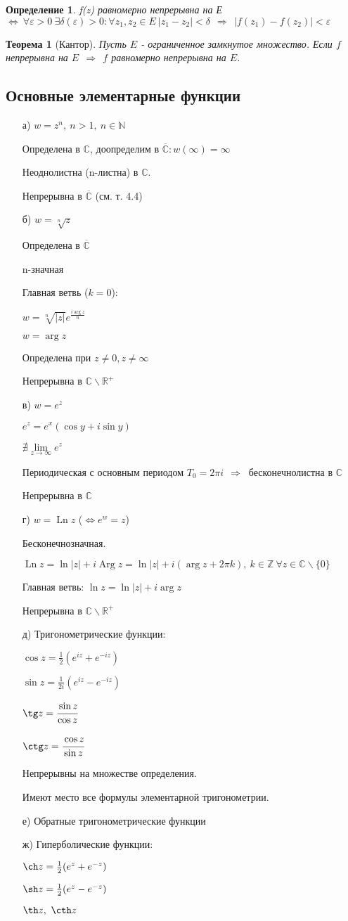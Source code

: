 \documentclass[draft]{report}
\newcommand{\then}{\ \Rightarrow\ }
\newcommand{\R}{\mathbb{R}}
\newcommand{\Z}{\mathbb{Z}}
\renewcommand{\C}{\mathbb{C}}
\newcommand{\N}{\mathbb{N}}
\newcommand{\mlim}[1]{\underset{#1}{\lim}}
\newcommand{\LRA}{\Leftrightarrow}
\newcommand{\epsdelta}{\forall \e>0\ \exists \delta(\e)>0\colon}
\renewcommand{\bar}{\overline}
\newcommand{\Ln}{\mathop{\mathrm{Ln}}\nolimits}
\newcommand{\Arg}{\mathop{\mathrm{Arg}}\nolimits}
\newcommand{\e}{\varepsilon}
\newcommand{\CC}{\bar{\C}}
\newcommand{\opr}[1]{\begin{opred}#1\end{opred}}
\newtheorem*{theor}{Теорема}
\newtheorem*{opred}{Определение}
\theoremstyle{remark}
\begin{document}
\opr{f(z) равномерно непрерывна на Е $\LRA\ \epsdelta \forall z_1,z_2\in E\ |z_1-z_2|<\delta\ \then\ |f(z_1)-f(z_2)|<\e$}

\begin{theor}[Кантор]
Пусть $E$ - ограниченное замкнутое множество. Если $f$ непрерывна на $E\ \then\ f$ равномерно непрерывна на $E$.
\end{theor}

\subsection{Основные элементарные функции}

\begin{itemize}
\item[а)] $w=z^n,\ n>1,\ n\in\N$

Определена в $\C$, доопределим в $\CC\colon w(\infty)=\infty$

Неоднолистна (n-листна) в $\C$.

Непрерывна в $\CC$ (см. т. 4.4)
\item[б)] $w=\sqrt[n]{z}$

Определена в $\CC$

n-значная

Главная ветвь ($k=0$):

$w=\sqrt[n]{|z|}e^{\frac{i\arg z}{n}}$

$w=\arg z$

Определена при $z\neq0,z\neq\infty$

Непрерывна в $\C\smallsetminus\R^+$
\item[в)] $w=e^z$

$e^z=e^x(\cos y+i\sin y)$

$\nexists\mlim{z\to\infty}e^z$

Периодическая с основным периодом $T_0=2\pi i\ \then$ бесконечнолистна в $\C$

Непрерывна в $\C$
\item[г)] $w=\Ln z$ ($\LRA e^w=z$)

Бесконечнозначная.

$\Ln z=\ln|z|+i\Arg z=\ln|z|+i(\arg z+2\pi k),\ k\in\Z\ \forall z\in\C\smallsetminus\{0\}$

Главная ветвь: $\ln z=\ln|z|+i\arg z$

Непрерывна в $\C\smallsetminus\R^+$
\item[д)] Тригонометрические функции:

$\cos z=\frac12(e^{iz}+e^{-iz})$

$\sin z=\frac1{2i}(e^{iz}-e^{-iz})$

$\tg z=\cfrac{\sin z}{\cos z}$

$\ctg z=\cfrac{\cos z}{\sin z}$

Непрерывны на множестве определения.

Имеют место все формулы элементарной тригонометрии.
\item[е)] Обратные тригонометрические функции
\item[ж)] Гиперболические функции:

$\ch z=\frac12(e^z+e^{-z})$

$\sh z=\frac12(e^z-e^{-z})$

$\th z,\ \cth z$
\end{itemize}
\end{document}
